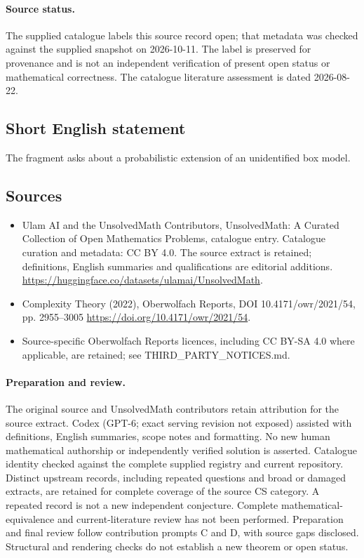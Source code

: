 \documentclass[11pt]{article}
\begin{document}
\paragraph{Source status.}
The supplied catalogue labels this source record open; that metadata was checked against the supplied snapshot on 2026-10-11. The label is preserved for provenance and is not an independent verification of present open status or mathematical correctness. The catalogue literature assessment is dated 2026-08-22.
\subsection{Short English statement}
The fragment asks about a probabilistic extension of an unidentified box model.
\subsection{Sources}
\begin{itemize}
\item[\hypertarget{source:statement:1}{S1}] Ulam AI and the UnsolvedMath Contributors, UnsolvedMath: A Curated Collection of Open Mathematics Problems, catalogue entry. Catalogue curation and metadata: CC BY 4.0. The source extract is retained; definitions, English summaries and qualifications are editorial additions.
\url{https://huggingface.co/datasets/ulamai/UnsolvedMath}.
\item[\hypertarget{source:statement:2}{S2}] Complexity Theory (2022), Oberwolfach Reports, DOI 10.4171/owr/2021/54, pp. 2955--3005
\url{https://doi.org/10.4171/owr/2021/54}.
\item Source-specific Oberwolfach Reports licences, including CC BY-SA 4.0 where applicable, are retained; see THIRD\_PARTY\_NOTICES.md.
\end{itemize}
\paragraph{Preparation and review.}
The original source and UnsolvedMath contributors retain attribution for the source extract. Codex (GPT-6; exact serving revision not exposed) assisted with definitions, English summaries, scope notes and formatting. No new human mathematical authorship or independently verified solution is asserted. Catalogue identity checked against the complete supplied registry and current repository. Distinct upstream records, including repeated questions and broad or damaged extracts, are retained for complete coverage of the source CS category. A repeated record is not a new independent conjecture. Complete mathematical-equivalence and current-literature review has not been performed. Preparation and final review follow contribution prompts C and D, with source gaps disclosed. Structural and rendering checks do not establish a new theorem or open status.
\label{end:statement}
\end{document}
